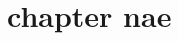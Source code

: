 \documentclass[a4paper]{article}
\begin{document}
\chapter{chapter nae}%
\label{cha:${1/\\w+{(.*?)}|\(.)|(\w+)|([^\w\]+)/(?4:_:\Lchapter name${1/\\w+{(.*?)}|\(.)|(\w+)|([^\w\]+)/(?4:_:\L\E)/ga\E)/ga}}


	
\enddocument}
\end{document}
